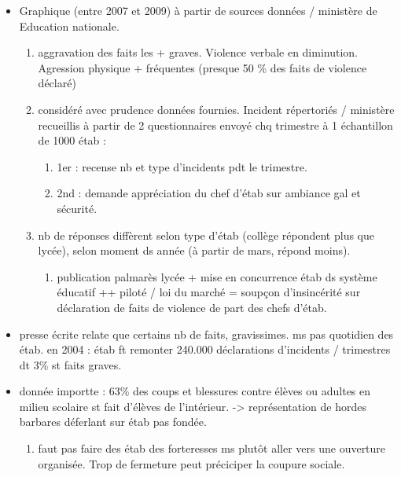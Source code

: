 \documentclass[12pt]{report}
\begin{document}
\begin{itemize}
\item Graphique (entre 2007 et 2009) à partir de sources données / ministère de Education nationale.
\begin{enumerate}
\item aggravation des faits les + graves. Violence verbale en diminution. Agression physique + fréquentes (presque 50 \% des faits de violence déclaré) \\
\item considéré avec prudence données fournies. Incident répertoriés / ministère recueillis à partir de 2 questionnaires envoyé chq trimestre à 1 échantillon de 1000 étab : 
\begin{enumerate}
\item 1er : recense nb et type d'incidents pdt le trimestre.\\
\item 2nd : demande appréciation du chef d'étab sur ambiance gal et sécurité.\\
\end{enumerate}

\item nb de réponses diffèrent selon type d'étab (collège répondent plus que lycée), selon moment ds année (à partir de mars, répond moins). \\
\begin{enumerate}
\item publication palmarès lycée + mise en concurrence étab ds système éducatif ++ piloté / loi du marché = soupçon d'insincérité sur déclaration de faits de violence de part des chefs d'étab.\\
\end{enumerate}

\end{enumerate}

\item presse écrite relate que certains nb de faits, gravissimes. ms pas quotidien des étab. en 2004 :  étab ft remonter 240.000 déclarations d'incidents / trimestres dt 3\% st faits graves.\\

\item donnée importte :  63\% des coups et blessures contre élèves ou adultes en milieu scolaire st fait d'élèves de l'intérieur. -> représentation de hordes barbares déferlant sur étab pas fondée.\\
\begin{enumerate}
\item faut pas faire des étab des forteresses ms plutôt aller vers une ouverture organisée. Trop de fermeture peut préciciper la coupure sociale.\\
\end{enumerate}


\end{itemize}
\end{document}
